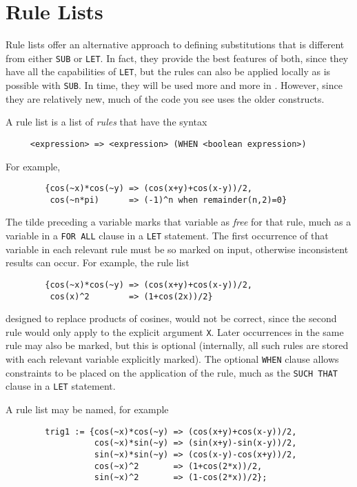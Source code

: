 \section{Rule Lists} 

Rule lists offer an alternative approach to defining substitutions that is
different from either \texttt{SUB} or \texttt{LET}.  In fact, they provide the
best features of both, since they have all the capabilities of \texttt{LET},
but the rules can also be applied locally as is possible with \texttt{SUB}.
In time, they will be used more and more in {\REDUCE}.  However, since they
are relatively new, much of the {\REDUCE} code you see uses the older
constructs.

\hypertarget{reserved:WHEN}{}
A rule list is a list of \emph{rules} that have the syntax
\begin{verbatim}
     <expression> => <expression> (WHEN <boolean expression>)
\end{verbatim}
For example,
\begin{verbatim}
        {cos(~x)*cos(~y) => (cos(x+y)+cos(x-y))/2,
         cos(~n*pi)      => (-1)^n when remainder(n,2)=0}
\end{verbatim}

The tilde preceding a variable marks that variable as \emph{free} for that
rule, much as a variable in a \texttt{FOR ALL} clause in a \texttt{LET}
statement.  The first occurrence of that variable in each relevant rule
must be so marked on input, otherwise inconsistent results can occur.
For example, the rule list
\begin{verbatim}
        {cos(~x)*cos(~y) => (cos(x+y)+cos(x-y))/2,
         cos(x)^2        => (1+cos(2x))/2}
\end{verbatim}
designed to replace products of cosines, would not be correct, since the
second rule would only apply to the explicit argument \texttt{X}.  Later
occurrences in the same rule may also be marked, but this is optional
(internally, all such rules are stored with each relevant variable
explicitly marked).  The optional \texttt{WHEN} clause allows
constraints to be placed on the application of the rule, much as the 
\texttt{SUCH THAT} clause in a \texttt{LET} statement.

A rule list may be named, for example
\begin{verbatim}
        trig1 := {cos(~x)*cos(~y) => (cos(x+y)+cos(x-y))/2,
                  cos(~x)*sin(~y) => (sin(x+y)-sin(x-y))/2,
                  sin(~x)*sin(~y) => (cos(x-y)-cos(x+y))/2,
                  cos(~x)^2       => (1+cos(2*x))/2,
                  sin(~x)^2       => (1-cos(2*x))/2};
\end{verbatim}

